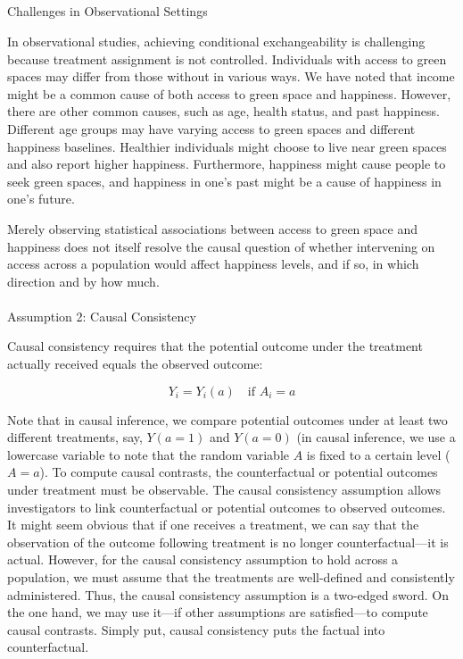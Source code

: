 \documentclass[
  singlecolumn]{article}
\makeatletter
\let\oldparagraph\paragraph
\renewcommand{\paragraph}{
    \@ifstar
      \xxxParagraphStar
      \xxxParagraphNoStar
  }
\newcommand{\xxxParagraphStar}[1]{\oldparagraph*{#1}\mbox{}}
\newcommand{\xxxParagraphNoStar}[1]{\oldparagraph{#1}\mbox{}}
\let\oldsubparagraph\subparagraph
\renewcommand{\subparagraph}{
    \@ifstar
      \xxxSubParagraphStar
      \xxxSubParagraphNoStar
  }
\newcommand{\xxxSubParagraphStar}[1]{\oldsubparagraph*{#1}\mbox{}}
\newcommand{\xxxSubParagraphNoStar}[1]{\oldsubparagraph{#1}\mbox{}}
\makeatother
\begin{document}
\subparagraph{Challenges in Observational
Settings}\label{challenges-in-observational-settings}

In observational studies, achieving conditional exchangeability is
challenging because treatment assignment is not controlled. Individuals
with access to green spaces may differ from those without in various
ways. We have noted that income might be a common cause of both access
to green space and happiness. However, there are other common causes,
such as age, health status, and past happiness. Different age groups may
have varying access to green spaces and different happiness baselines.
Healthier individuals might choose to live near green spaces and also
report higher happiness. Furthermore, happiness might cause people to
seek green spaces, and happiness in one's past might be a cause of
happiness in one's future.

Merely observing statistical associations between access to green space
and happiness does not itself resolve the causal question of whether
intervening on access across a population would affect happiness levels,
and if so, in which direction and by how much.

\paragraph{Assumption 2: Causal
Consistency}\label{assumption-2-causal-consistency}

Causal consistency requires that the potential outcome under the
treatment actually received equals the observed outcome:

\[
Y_i = Y_i(a) \quad \text{if } A_i = a
\]

Note that in causal inference, we compare potential outcomes under at
least two different treatments, say, \(Y(a = 1)\) and \(Y(a = 0)\) (in
causal inference, we use a lowercase variable to note that the random
variable \(A\) is fixed to a certain level (\(A = a\)). To compute
causal contrasts, the counterfactual or potential outcomes under
treatment must be observable. The causal consistency assumption allows
investigators to link counterfactual or potential outcomes to observed
outcomes. It might seem obvious that if one receives a treatment, we can
say that the observation of the outcome following treatment is no longer
counterfactual---it is actual. However, for the causal consistency
assumption to hold across a population, we must assume that the
treatments are well-defined and consistently administered. Thus, the
causal consistency assumption is a two-edged sword. On the one hand, we
may use it---if other assumptions are satisfied---to compute causal
contrasts. Simply put, causal consistency puts the factual into
counterfactual.
\end{document}
